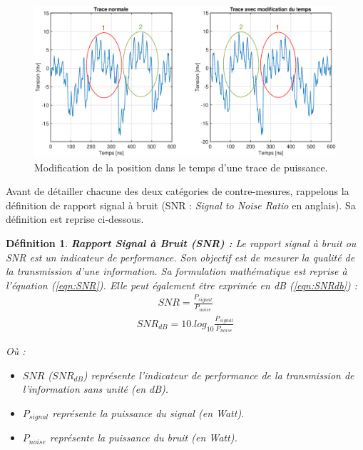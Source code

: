 \documentclass[oneside]{book}
\newtheorem{definition}{Définition}[section]
\begin{document}
\begin{figure}[htbp]
    \centering
    \includegraphics[scale=0.32]{image/trace_Time}
    \caption{Modification de la position dans le temps d'une trace de puissance.}
    \label{fig:trace_Time}
\end{figure}

\hspace{-0.5cm}Avant de détailler chacune des deux catégories de contre-mesures, rappelons la définition de rapport signal à bruit (SNR : \textit{Signal to Noise Ratio} en anglais). Sa définition \cite{bruit} est reprise ci-dessous. 

\theoremstyle{definition}
\begin{definition}{\textbf{Rapport Signal à Bruit (SNR) :}}
Le rapport signal à bruit ou SNR est un indicateur de performance. Son objectif est de mesurer la qualité de la transmission d'une information. Sa formulation mathématique est reprise à l'équation (\ref{eqn:SNR}). Elle peut également être exprimée en \textit{dB} (\ref{eqn:SNRdb}) : \\

\begin{gather}
	SNR = \frac{P_{signal}}{P_{noise}} \label{eqn:SNR}
\end{gather}
\begin{gather}
	SNR_{dB} = 10.log_{10}\frac{P_{signal}}{P_{noise}} \label{eqn:SNRdb}
\end{gather}

\hspace{-0.5 cm}Où :
\begin{itemize}
\item $SNR$ ($SNR_{dB}$) représente l'indicateur de performance de la transmission de l'information sans unité (en dB).
\item $P_{signal}$ représente la puissance du signal (en \textit{Watt}).
\item $P_{noise}$ représente la puissance du bruit (en \textit{Watt}). \\
\end{itemize}
\end{definition}
\end{document}

